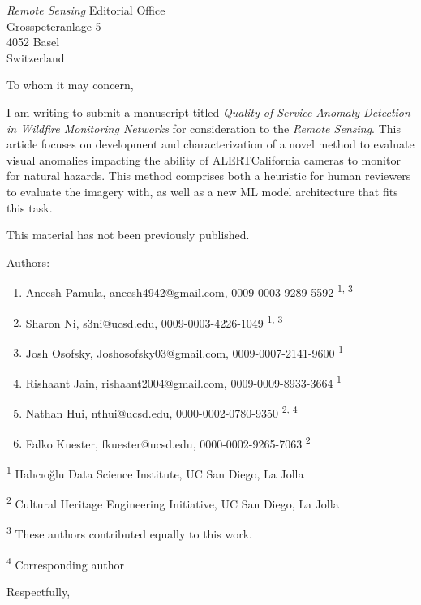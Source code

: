 \documentclass{letter}
\begin{document}
\begin{letter}{\textit{Remote Sensing} Editorial Office\\Grosspeteranlage 5\\4052 Basel\\Switzerland}
\opening{To whom it may concern,}

I am writing to submit a manuscript titled \textit{Quality of Service Anomaly Detection in Wildfire Monitoring Networks} for consideration to the \textit{Remote Sensing}. This article focuses on development and characterization of a novel method to evaluate visual anomalies impacting the ability of ALERTCalifornia cameras to monitor for natural hazards. This method comprises both a heuristic for human reviewers to evaluate the imagery with, as well as a new ML model architecture that fits this task.

This material has not been previously published.

Authors:
\begin{enumerate}
    \item Aneesh Pamula, aneesh4942@gmail.com, 0009-0003-9289-5592 \textsuperscript{1, 3}
    \item Sharon Ni, s3ni@ucsd.edu, 0009-0003-4226-1049 \textsuperscript{1, 3}
    \item Josh Osofsky, Joshosofsky03@gmail.com, 0009-0007-2141-9600 \textsuperscript{1}
    \item Rishaant Jain, rishaant2004@gmail.com, 0009-0009-8933-3664 \textsuperscript{1}
    \item Nathan Hui, nthui@ucsd.edu, 0000-0002-0780-9350 \textsuperscript{2, 4}
    \item Falko Kuester, fkuester@ucsd.edu, 0000-0002-9265-7063 \textsuperscript{2}
\end{enumerate}

\textsuperscript{1} Halıcıoğlu Data Science Institute, UC San Diego, La Jolla

\textsuperscript{2} Cultural Heritage Engineering Initiative, UC San Diego, La Jolla

\textsuperscript{3} These authors contributed equally to this work.

\textsuperscript{4} Corresponding author


\closing{Respectfully,}
\end{letter}
\end{document}
